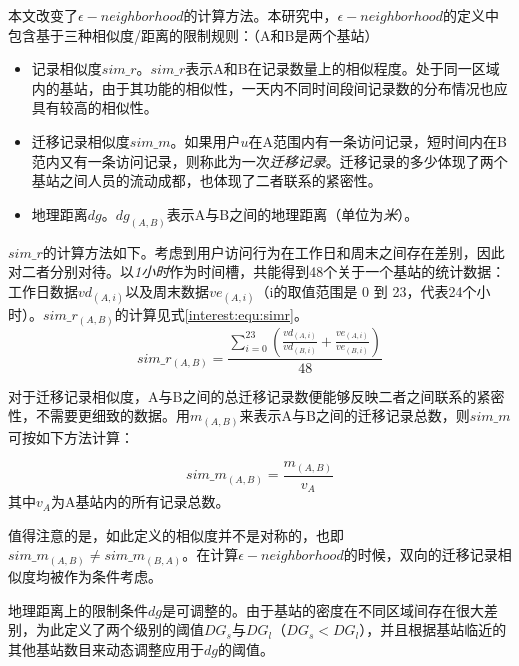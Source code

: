 本文改变了$\epsilon-neighborhood$的计算方法。本研究中，$\epsilon-neighborhood$的定义中包含基于三种相似度/距离的限制规则：（A和B是两个基站）
\begin{itemize}
	\item 记录相似度$sim\_r$。$sim\_r$表示A和B在记录数量上的相似程度。处于同一区域内的基站，由于其功能的相似性，一天内不同时间段间记录数的分布情况也应具有较高的相似性。
	\item 迁移记录相似度$sim\_m$。如果用户$u$在A范围内有一条访问记录，短时间内在B范内又有一条访问记录，则称此为一次\textit{迁移记录}。迁移记录的多少体现了两个基站之间人员的流动成都，也体现了二者联系的紧密性。
	\item 地理距离$dg$。$dg_{(A,B)}$表示A与B之间的地理距离（单位为\textit{米}）。
\end{itemize}
$sim\_r$的计算方法如下。考虑到用户访问行为在工作日和周末之间存在差别，因此对二者分别对待。以\textit{1小时}作为时间槽，共能得到48个关于一个基站的统计数据：工作日数据$vd_(A,i)$以及周末数据$ve_(A,i)$（i的取值范围是 0 到 23，代表24个小时）。$sim\_r_{(A,B)}$的计算见式\ref{interest:equ:simr}。
\begin{equation}
\label{interest:equ:simr}
	sim\_r_{(A,B)} = \frac{\sum_{i=0}^{23}{\left(\frac{vd_{(A,i)}}{vd_{(B,i)}} + \frac{ve_{(A,i)}}{ve_{(B,i)}}\right)}}{48}
\end{equation}

对于迁移记录相似度，A与B之间的总迁移记录数便能够反映二者之间联系的紧密性，不需要更细致的数据。用$m_{(A,B)}$来表示A与B之间的迁移记录总数，则$sim\_m$可按如下方法计算：

\begin{equation}
	sim\_m_{(A,B)} = \frac{m_{(A,B)}}{v_A}
\end{equation}
其中$v_A$为A基站内的所有记录总数。

值得注意的是，如此定义的相似度并不是对称的，也即$sim\_m_{(A,B)} \neq sim\_m_{(B,A)} $。在计算$\epsilon-neighborhood$的时候，双向的迁移记录相似度均被作为条件考虑。 

地理距离上的限制条件$dg$是可调整的。由于基站的密度在不同区域间存在很大差别，为此定义了两个级别的阈值$DG_s$与$DG_l$（$DG_s < DG_l$），并且根据基站临近的其他基站数目来动态调整应用于$dg$的阈值。 

